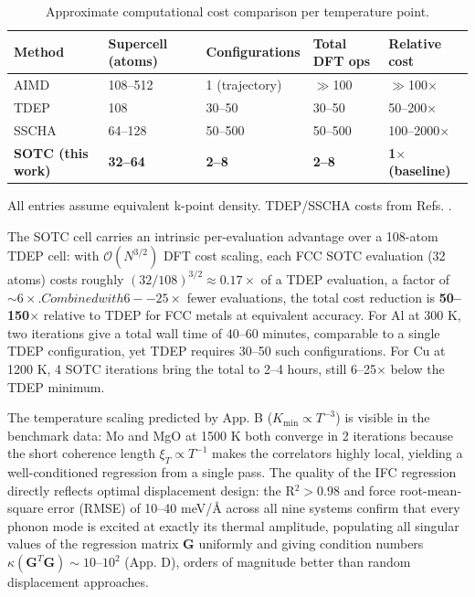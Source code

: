 \documentclass[aps,prb,reprint,amsmath,amssymb,floatfix]{revtex4-2}
\begin{document}
\begin{table}[htbp]
\caption{Approximate computational cost comparison per temperature point.}
\begin{ruledtabular}
\begin{tabular}{lllll}Method & Supercell (atoms) & Configurations & Total DFT ops & Relative cost \\
\hline
AIMD & 108--512 & 1 (trajectory) & $\gg$100 & $\gg$100$\times$ \\
TDEP \cite{ref5} & 108 & 30--50 & 30--50 & 50--200$\times$ \\
SSCHA \cite{ref7} & 64--128 & 50--500 & 50--500 & 100--2000$\times$ \\
\textbf{SOTC (this work)} & \textbf{32--64} & \textbf{2--8} &
\textbf{2--8} & \textbf{1$\times$ (baseline)} \\
\end{tabular}
\end{ruledtabular}
\label{tab:4}
\end{table}

All entries assume equivalent k-point density. TDEP/SSCHA costs from
Refs. \cite{ref5,ref7}.

The SOTC cell carries an intrinsic per-evaluation advantage over a
108-atom TDEP cell: with \(\mathcal{O}(N^{3/2})\) DFT cost scaling, each
FCC SOTC evaluation (32 atoms) costs roughly
\((32/108)^{3/2} \approx 0.17\times\) of a TDEP evaluation, a factor of
$\sim6\times. Combined with 6--25\times$ fewer evaluations, the
total cost reduction is \textbf{50--150\(\times\)} relative to TDEP for
FCC metals at equivalent accuracy. For Al at 300 K, two iterations give
a total wall time of 40--60 minutes, comparable to a single TDEP
configuration, yet TDEP requires 30--50 such configurations. For Cu
at 1200 K, 4 SOTC iterations bring the total to 2--4 hours, still
6--25\(\times\) below the TDEP minimum.

The temperature scaling predicted by App. B
(\(K_\text{min} \propto T^{-3}\)) is visible in the benchmark data: Mo
and MgO at 1500 K both converge in 2 iterations because the short
coherence length \(\xi_T \propto T^{-1}\) makes the correlators highly
local, yielding a well-conditioned regression from a single pass. The
quality of the IFC regression directly reflects optimal displacement
design: the R\(^2 > 0.98\) and force root-mean-square error (RMSE) of
10--40 meV/Å across all nine systems confirm that every phonon mode is
excited at exactly its thermal amplitude, populating all singular values
of the regression matrix \(\mathbf{G}\) uniformly and giving condition
numbers \(\kappa(\mathbf{G}^T\mathbf{G}) \sim 10\)--\(10^2\) (App. D),
orders of magnitude better than random displacement approaches.
\end{document}
